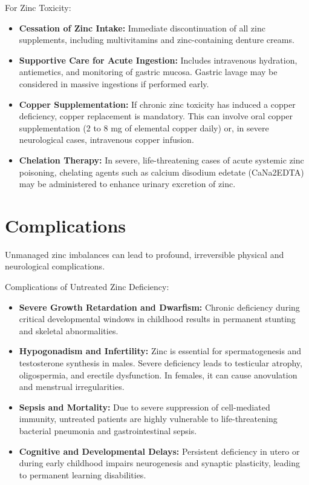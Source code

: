 For Zinc Toxicity:
\begin{itemize}
    \item \textbf{Cessation of Zinc Intake:} Immediate discontinuation of all zinc supplements, including multivitamins and zinc-containing denture creams.
    \item \textbf{Supportive Care for Acute Ingestion:} Includes intravenous hydration, antiemetics, and monitoring of gastric mucosa. Gastric lavage may be considered in massive ingestions if performed early.
    \item \textbf{Copper Supplementation:} If chronic zinc toxicity has induced a copper deficiency, copper replacement is mandatory. This can involve oral copper supplementation (2 to 8 mg of elemental copper daily) or, in severe neurological cases, intravenous copper infusion.
    \item \textbf{Chelation Therapy:} In severe, life-threatening cases of acute systemic zinc poisoning, chelating agents such as calcium disodium edetate (CaNa2EDTA) may be administered to enhance urinary excretion of zinc.
\end{itemize}

\section*{Complications}
Unmanaged zinc imbalances can lead to profound, irreversible physical and neurological complications.

Complications of Untreated Zinc Deficiency:
\begin{itemize}
    \item \textbf{Severe Growth Retardation and Dwarfism:} Chronic deficiency during critical developmental windows in childhood results in permanent stunting and skeletal abnormalities.
    \item \textbf{Hypogonadism and Infertility:} Zinc is essential for spermatogenesis and testosterone synthesis in males. Severe deficiency leads to testicular atrophy, oligospermia, and erectile dysfunction. In females, it can cause anovulation and menstrual irregularities.
    \item \textbf{Sepsis and Mortality:} Due to severe suppression of cell-mediated immunity, untreated patients are highly vulnerable to life-threatening bacterial pneumonia and gastrointestinal sepsis.
    \item \textbf{Cognitive and Developmental Delays:} Persistent deficiency in utero or during early childhood impairs neurogenesis and synaptic plasticity, leading to permanent learning disabilities.
\end{itemize}


